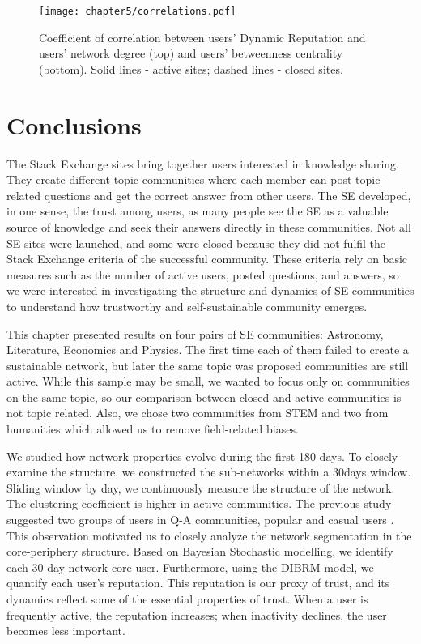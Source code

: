 \begin{figure}[h]
	\centering
	\texttt{[image: chapter5/correlations.pdf]}
	\caption[Coefficient correlation between ]{Coefficient of correlation between users’ Dynamic Reputation and users’ network degree (top) and users’ betweenness centrality (bottom). Solid lines - active sites; dashed lines - closed sites.}
	\label{fig:dyn_rep_centrality}
\end{figure}

\section{Conclusions}

The Stack Exchange sites bring together users interested in knowledge sharing. They create different topic communities where each member can post topic-related questions and get the correct answer from other users. The SE developed, in one sense, the trust among users, as many people see the SE as a valuable source of knowledge and seek their answers directly in these communities. Not all SE sites were launched, and some were closed because they did not fulfil the Stack Exchange criteria of the successful community. These criteria rely on basic measures such as the number of active users, posted questions, and answers, so we were interested in investigating the structure and dynamics of SE communities to understand how trustworthy and self-sustainable community emerges. 

This chapter presented results on four pairs of SE communities: Astronomy, Literature, Economics and Physics. The first time each of them failed to create a sustainable network, but later the same topic was proposed communities are still active. While this sample may be small, we wanted to focus only on communities on the same topic, so our comparison between closed and active communities is not topic related. Also, we chose two communities from STEM and two from humanities which allowed us to remove field-related biases. 

We studied how network properties evolve during the first 180 days. To closely examine the structure, we constructed the sub-networks within a 30days window. Sliding window by day, we continuously measure the structure of the network. The clustering coefficient is higher in active communities. The previous study suggested two groups of users in Q-A communities, popular and casual users \cite{santos2019self}. This observation motivated us to closely analyze the network segmentation in the core-periphery structure. Based on Bayesian Stochastic modelling, we identify each 30-day network core user.
Furthermore, using the DIBRM model\cite{melnikov2018toward}, we quantify each user's reputation. This reputation is our proxy of trust, and its dynamics reflect some of the essential properties of trust. When a user is frequently active, the reputation increases; when inactivity declines, the user becomes less important.   

